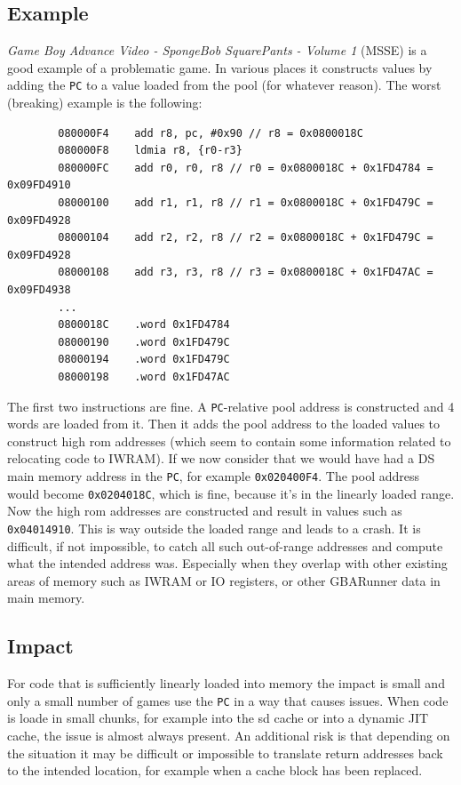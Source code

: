 \documentclass[a4paper,10pt]{report}
\begin{document}
	\subsection{Example}
	\textit{Game Boy Advance Video - SpongeBob SquarePants - Volume 1} (MSSE) is a good example of a problematic game. In various places it constructs values by adding the \texttt{PC} to a value loaded from the pool (for whatever reason). The worst (breaking) example is the following:	
	\begin{verbatim}
		080000F4    add r8, pc, #0x90 // r8 = 0x0800018C
		080000F8    ldmia r8, {r0-r3}
		080000FC    add r0, r0, r8 // r0 = 0x0800018C + 0x1FD4784 = 0x09FD4910
		08000100    add r1, r1, r8 // r1 = 0x0800018C + 0x1FD479C = 0x09FD4928
		08000104    add r2, r2, r8 // r2 = 0x0800018C + 0x1FD479C = 0x09FD4928
		08000108    add r3, r3, r8 // r3 = 0x0800018C + 0x1FD47AC = 0x09FD4938
		...
		0800018C    .word 0x1FD4784
		08000190    .word 0x1FD479C
		08000194    .word 0x1FD479C
		08000198    .word 0x1FD47AC
	\end{verbatim}
	The first two instructions are fine. A \texttt{PC}-relative pool address is constructed and 4 words are loaded from it. Then it adds the pool address to the loaded values to construct high rom addresses (which seem to contain some information related to relocating code to IWRAM). If we now consider that we would have had a DS main memory address in the \texttt{PC}, for example \texttt{0x020400F4}. The pool address would become \texttt{0x0204018C}, which is fine, because it's in the linearly loaded range. Now the high rom addresses are constructed and result in values such as \texttt{0x04014910}. This is way outside the loaded range and leads to a crash. It is difficult, if not impossible, to catch all such out-of-range addresses and compute what the intended address was. Especially when they overlap with other existing areas of memory such as IWRAM or IO registers, or other GBARunner data in main memory.
	
	\subsection{Impact}
	For code that is sufficiently linearly loaded into memory the impact is small and only a small number of games use the \texttt{PC} in a way that causes issues. When code is loade in small chunks, for example into the sd cache or into a dynamic JIT cache, the issue is almost always present. An additional risk is that depending on the situation it may be difficult or impossible to translate return addresses back to the intended location, for example when a cache block has been replaced.
	
\end{document}
